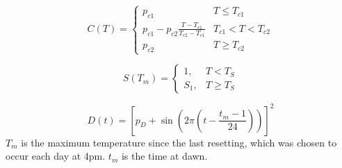 \documentclass[11pt, a4paper]{article}
\begin{document}
\begin{equation}
    C(T) =
    \begin{cases}
    p_{c1} & T \leq T_{c1} \\
    p_{c1}-p_{c2}\frac{T-T_{c1}}{T_{c2}-T_{c1}} & T_{c1} < T < T_{c2} \\
    p_{c2} & T \geq T_{c2}
    \end{cases}
\end{equation}

\begin{equation}
    S(T_m) = 
    \begin{cases}
    1, & T < T_S \\
    S_1, & T \geq T_S
    \end{cases}
\end{equation}

\begin{equation}
    D(t) =  \left[p_D + \sin\left(2\pi\left(t - \frac{t_m-1}{24}\right)\right)\right]^2
\end{equation}
$T_m$ is the maximum temperature since the last resetting, which was chosen to occur each day at 4pm.
$t_m$ is the time at dawn.
\end{document}
